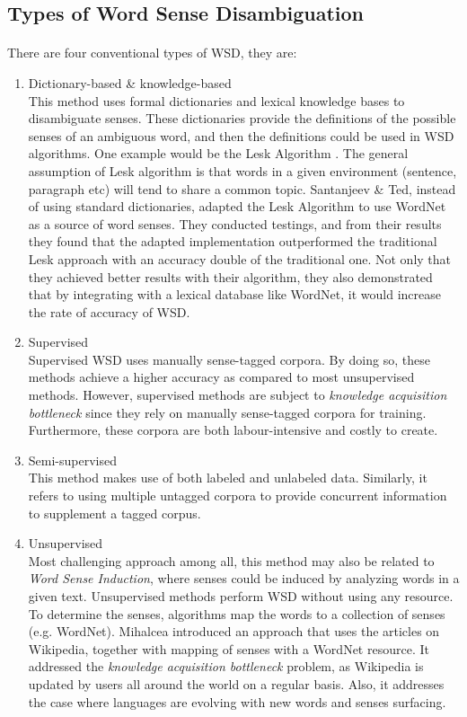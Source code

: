 \documentclass[12 pt]{article}
\begin{document}
\subsection{Types of Word Sense Disambiguation}
\paragraph{}
There are four conventional types of WSD, they are:
\begin{enumerate}
\item{Dictionary-based \& knowledge-based \\
This method uses formal dictionaries and lexical knowledge bases to disambiguate senses. These dictionaries provide the definitions of the possible senses of an ambiguous word, and then the definitions could be used in WSD algorithms. One example would be the Lesk Algorithm \cite{lesk}. The general assumption of Lesk algorithm is that words in a given environment (sentence, paragraph etc) will tend to share a common topic. Santanjeev \& Ted, instead of using standard dictionaries,  adapted the Lesk Algorithm to use WordNet \cite{wordnet} as a source of word senses. They conducted testings, and from their results they found that the adapted implementation outperformed the traditional Lesk approach with an accuracy double of the traditional one. Not only that they achieved better results with their algorithm, they also demonstrated that by integrating with a lexical database like WordNet, it would increase the rate of accuracy of WSD.}
\item{Supervised \\
Supervised WSD uses manually sense-tagged corpora. By doing so, these methods achieve a higher accuracy as compared to most unsupervised methods. However, supervised methods are subject to \textit{knowledge acquisition bottleneck} since they rely on manually sense-tagged corpora for training. Furthermore, these corpora are both labour-intensive and costly to create.}
\item{Semi-supervised \\
This method makes use of both labeled and unlabeled data. Similarly, it refers to using multiple untagged corpora to provide concurrent information to supplement a tagged corpus.}
\item{Unsupervised \\
Most challenging approach among all, this method may also be related to \textit{Word Sense Induction}, where senses could be induced by analyzing words in a given text. Unsupervised methods perform WSD without using any resource. To determine the senses, algorithms map the words to a collection of senses (e.g. WordNet). Mihalcea \cite{wikipedia} introduced an approach that uses the articles on Wikipedia, together with mapping of senses with a WordNet resource. It addressed the \textit{knowledge acquisition bottleneck} problem, as Wikipedia is updated by users all around the world on a regular basis. Also, it addresses the case where languages are evolving with new words and senses surfacing.}
\end{enumerate}
\end{document}
